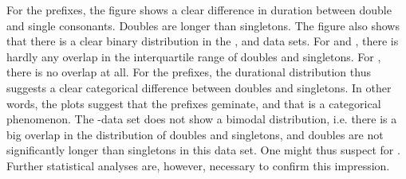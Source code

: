  
For the prefixes, the figure shows a clear difference in duration between double and single consonants. Doubles are longer than singletons. The figure also shows that there is a clear binary distribution in the ,  and data sets.  For  and , there is hardly any overlap in the interquartile range of doubles and singletons. For , there is no overlap at all. For the prefixes, the durational distribution thus suggests a clear categorical difference between doubles and singletons. In other words, the plots suggest that the prefixes geminate, and that  is a categorical phenomenon. 
The -data set does not show a bimodal distribution, i.e. there is a big overlap in the distribution of doubles and singletons, and doubles are not significantly longer than singletons in this data set. One might thus suspect  for . Further statistical analyses are, however, necessary to confirm this impression.











